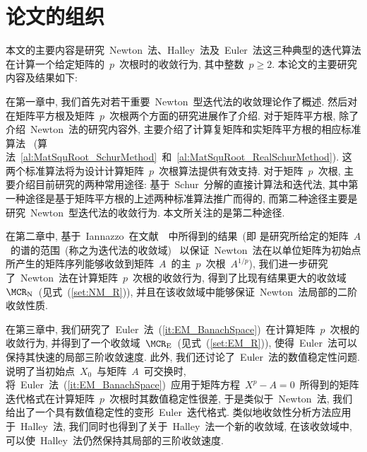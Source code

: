 





























\section{论文的组织}



本文的主要内容是研究~Newton~法、Halley~法及~Euler~法这三种典型的迭代算法
在计算一个给定矩阵的~$p$~次根时的收敛行为, 其中整数~$p\geq2$.
本论文的主要研究内容及结果如下:

在第一章中, 我们首先对若干重要~Newton~型迭代法的收敛理论作了概述.
然后对在矩阵平方根及矩阵~$p$~次根两个方面的研究进展作了介绍.
对于矩阵平方根, 除了介绍~Newton~法的研究内容外,
主要介绍了计算复矩阵和实矩阵平方根的相应标准算法
~(算法~\ref{al:MatSquRoot_SchurMethod}~和~\ref{al:MatSquRoot_RealSchurMethod}).
这两个标准算法将为设计计算矩阵~$p$~次根算法提供有效支持.
对于矩阵~$p$~次根, 主要介绍目前研究的两种常用途径:
基于~Schur~分解的直接计算法和迭代法,
其中第一种途径是基于矩阵平方根的上述两种标准算法推广而得的,
而第二种途径主要是研究~Newton~型迭代法的收敛行为.
本文所关注的是第二种途径.

在第二章中,
基于~Iannazzo~在文献~\cite{Iannazzo2006}~中所得到的结果~(即
是研究所给定的矩阵~$A$~的谱的范围~(称之为迭代法的收敛域)~
以保证~Newton~法在以单位矩阵为初始点所产生的矩阵序列能够收敛到矩阵~$A$~的主~$p$~次根~$A^{1/p}$),
我们进一步研究了~Newton~法在计算矩阵~$p$~次根的收敛行为,
得到了比现有结果更大的收敛域~$\MCR_{\text{N}}$~(见式~(\ref{set:NM_R})),
并且在该收敛域中能够保证~Newton~法局部的二阶收敛性质.


在第三章中,
我们研究了~Euler~法~(\ref{it:EM_BanachSpace})~在计算矩阵~$p$~次根的收敛行为,
并得到了一个收敛域~$\MCR_{\text{E}}$~(见式~(\ref{set:EM_R})),
使得~Euler~法可以保持其快速的局部三阶收敛速度. 此外,
我们还讨论了~Euler~法的数值稳定性问题.
说明了当初始点~$X_0$~与矩阵~$A$~可交换时,
将~Euler~法~(\ref{it:EM_BanachSpace})~应用于矩阵方程~$X^p -
A=0$~所得到的矩阵迭代格式在计算矩阵~$p$~次根时其数值稳定性很差,
于是类似于~Newton~法,
我们给出了一个具有数值稳定性的变形~Euler~迭代格式.
类似地收敛性分析方法应用于~Halley~法,
我们同时也得到了关于~Halley~法一个新的收敛域, 在该收敛域中,
可以使~Halley~法仍然保持其局部的三阶收敛速度.



